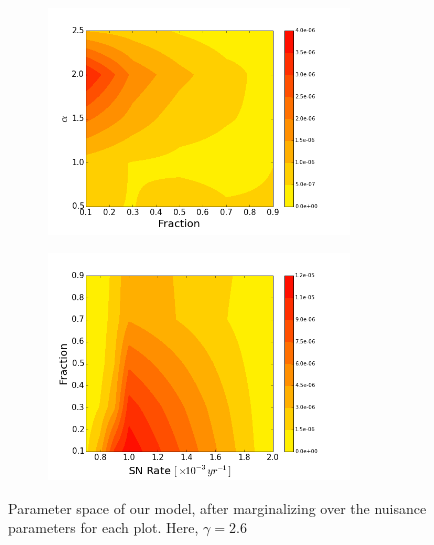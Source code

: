 \documentclass[10pt,a4paper]{article}
\begin{document}
\begin{figure}[h!]
\begin{subfigure}[b]{0.5\textwidth}
		\caption{}
	\end{subfigure}
	\begin{subfigure}[b]{0.5\textwidth}
		\includegraphics[width=8cm]{AlphaFraction_gamma26.png}
		\caption{}
	\end{subfigure}
	\begin{subfigure}[b]{0.5\textwidth}
		\includegraphics[width=8cm]{FractionRate_gamma26.png}
		\caption{}
	\end{subfigure}
	\caption{Parameter space of our model, after marginalizing over the nuisance parameters for each plot. Here, $\gamma = 2.6$}
\end{figure}
\end{document}

